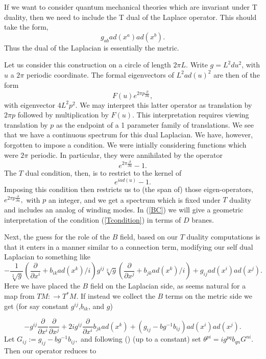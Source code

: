 \documentclass[a4paper,11pt]{amsart}
\begin{document}
If we want to consider quantum mechanical theories which are invariant under T
duality, then we need to include the T dual of the Laplace operator. 
This should take the form, 
$$g_{ab}ad(x^a)ad(x^b).$$
Thus the dual of the Laplacian is essentially the metric. 


Let us consider this construction on a circle of length $2\pi L$.  Write 
$g = L^2 du^2$, with $u$ a $2\pi$ periodic coordinate.  
The formal eigenvectors of $L^2 ad(u)^2$ are then 
of the form 
$$F(u)e^{2\pi p\frac{\partial}{\partial u}},$$
with eigenvector $4L^2p^2$. 
We may interpret this latter operator as translation by $2\pi p$ followed by
multiplication by $F(u)$. This interpretation requires viewing translation by
$p$ as the endpoint of a 1 parameter family of translations. We see that we have a
continuous spectrum for this dual Laplacian. We have, however, forgotten to
 impose a condition. We were intially considering functions which were
 $2\pi$ periodic. In particular, they were annihilated by the operator 
 $$e^{2\pi\frac{\partial}{\partial u}} - 1.$$
 The $T$ dual condition, then, is to restrict to the kernel of 
 \begin{equation}\label{Tcondition}
 e^{i ad(u)} - 1.
 \end{equation}
  Imposing this condition then restricts us to (the span of) 
  those eigen-operators, $e^{2\pi p\frac{\partial}{\partial u}},$
   with $p$ an integer, 
  and we get a spectrum which is fixed under $T$ duality and includes an analog
  of winding modes. 
   In (\ref{BC}) we will give a geometric interpretation of the condition
   (\ref{Tcondition}) in terms of $D$ branes.
   
   
 Next, the guess for the role of the $B$ field, based on our $T$ duality
computations is that it enters in a manner similar to a connection term,
 modifying our self dual Laplacian to something
like
$$-\frac{1}{\sqrt[2]{g}}(\frac{\partial}{\partial x^i} + b_{ik}ad(x^k)/i)g^{ij}\sqrt[2]{g}
(\frac{\partial}{\partial x^j}+b_{jk}ad(x^k)/i)
+ g_{ij}ad(x^i)ad(x^j).$$ 
Here we have placed the $B$ field on the Laplacian side, as seems natural for 
a map from $TM:\rightarrow T^*M.$ If instead we collect the $B$ terms on the 
metric side we get (for say constant $g^{ij}$,$b_{ik}$, and $g$)

$$-g^{ij}\frac{\partial}{\partial x^i}\frac{\partial}{\partial x^j}
+ 2ig^{ij}\frac{\partial}{\partial x^i}b_{jk}ad(x^k)
+ (g_{ij}-bg^{-1}b_{ij})ad(x^i)ad(x^j).$$ 
Let $G_{ij}:= g_{ij}-bg^{-1}b_{ij},$ and following (\cite{SW})
(up to a constant) set $\theta^{pi} = ig^{pq}b_{qn}G^{ni}.$ 
Then our operator reduces to 
\end{document}
